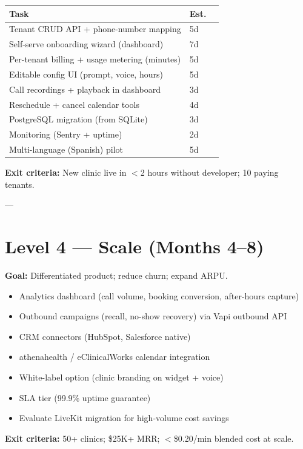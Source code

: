 \documentclass[11pt,a4paper]{article}
\begin{document}
\begin{center}
\small
\begin{tabular}{@{}lll@{}}
\toprule
\textbf{Task} & \textbf{Est.} \\
\midrule
Tenant CRUD API + phone-number mapping & 5d \\
Self-serve onboarding wizard (dashboard) & 7d \\
Per-tenant billing + usage metering (minutes) & 5d \\
Editable config UI (prompt, voice, hours) & 5d \\
Call recordings + playback in dashboard & 3d \\
Reschedule + cancel calendar tools & 4d \\
PostgreSQL migration (from SQLite) & 3d \\
Monitoring (Sentry + uptime) & 2d \\
Multi-language (Spanish) pilot & 5d \\
\bottomrule
\end{tabular}
\end{center}

\textbf{Exit criteria:} New clinic live in $<$2 hours without developer; 10 paying tenants.

---

\section{Level 4 --- Scale (Months 4--8)}

\textbf{Goal:} Differentiated product; reduce churn; expand ARPU.

\begin{itemize}[nosep]
  \item Analytics dashboard (call volume, booking conversion, after-hours capture)
  \item Outbound campaigns (recall, no-show recovery) via Vapi outbound API
  \item CRM connectors (HubSpot, Salesforce native)
  \item athenahealth / eClinicalWorks calendar integration
  \item White-label option (clinic branding on widget + voice)
  \item SLA tier (99.9\% uptime guarantee)
  \item Evaluate LiveKit migration for high-volume cost savings
\end{itemize}

\textbf{Exit criteria:} 50+ clinics; \$25K+ MRR; $<$\$0.20/min blended cost at scale.
\end{document}
